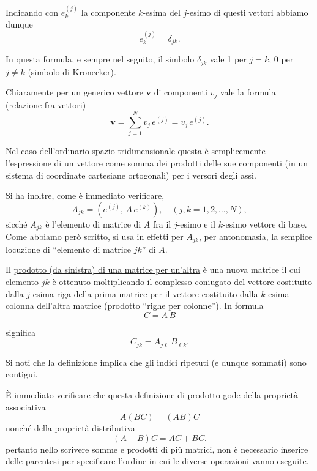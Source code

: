 \documentclass[11pt, a4paper]{book}
\numberwithin{equation}{section}
\begin{document}
Indicando con $e^{(j)}_k$ la componente $k$-esima del $j$-esimo di questi vettori abbiamo dunque
\begin{equation}
    e^{(j)}_k = \delta_{jk}.
    \tag{8b}
\end{equation}

In questa formula, e sempre nel seguito, il simbolo $\delta_{jk}$ vale 1 per $j=k$, 0 per $j \neq k$ (simbolo di Kronecker).

Chiaramente per un generico vettore $\mathbf{v}$ di componenti $v_j$ vale la formula (relazione fra vettori)
\begin{equation}
    \mathbf{v} = \sum_{j=1}^{N} v_j\, e^{(j)} = v_j\, e^{(j)}.
    \tag{9}
\end{equation}

Nel caso dell'ordinario spazio tridimensionale questa è semplicemente l'espressione di un vettore come somma dei prodotti delle sue componenti (in un sistema di coordinate cartesiane ortogonali) per i versori degli assi.

Si ha inoltre, come è immediato verificare,
\begin{equation}
    A_{jk} = \left( e^{(j)},\, A\, e^{(k)} \right), \quad (j,k = 1,2,\ldots,N),
    \tag{10}
\end{equation}
sicché $A_{jk}$ è l'elemento di matrice di $A$ fra il $j$-esimo e il $k$-esimo vettore di base. Come abbiamo però scritto, si usa in effetti per $A_{jk}$, per antonomasia, la semplice locuzione di ``elemento di matrice $jk$'' di $A$.

Il \uline{prodotto (da sinistra) di una matrice per un'altra} è una nuova matrice il cui elemento $jk$ è ottenuto moltiplicando il complesso coniugato del vettore costituito dalla $j$-esima riga della prima matrice per il vettore costituito dalla $k$-esima colonna dell'altra matrice (prodotto ``righe per colonne''). In formula
\begin{equation}
    C = A\,B
    \tag{11a}
\end{equation}

significa
\begin{equation}
    C_{jk} = A_{j\ell}\, B_{\ell k}.
    \tag{11b}
\end{equation}

Si noti che la definizione implica che gli indici ripetuti (e dunque sommati) sono contigui.

È immediato verificare che questa definizione di prodotto gode della proprietà associativa
\begin{equation}
    A(BC) = (AB)C
    \tag{12}
\end{equation}
nonché della proprietà distributiva
\begin{equation}
    (A + B)C = AC + BC.
    \tag{12b}
\end{equation}
pertanto nello scrivere somme e prodotti di più matrici, non è necessario inserire delle parentesi per specificare l'ordine in cui le diverse operazioni vanno eseguite.
\end{document}
